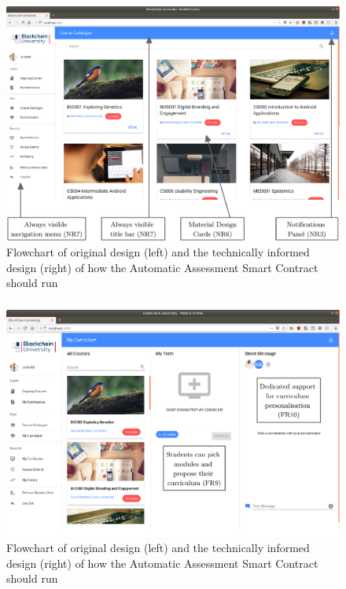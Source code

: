 \begin{figure}[!ht]
	\centering
	\includegraphics[width=1.0\textwidth]{Learner_allcourses}
	\caption[Learner Application Course Catalogue Page]
	{Flowchart of original design (left) and the technically informed design (right) of how the Automatic Assessment Smart Contract should run}
	\label{fig:Learner_allcourses}
\end{figure}

\begin{figure}[!ht]
	\centering
	\includegraphics[width=1.0\textwidth]{Learner_customiser}
	\caption[Learner Application My Curriculum Page]
	{Flowchart of original design (left) and the technically informed design (right) of how the Automatic Assessment Smart Contract should run}
	\label{fig:Learner_customiser}
\end{figure}

